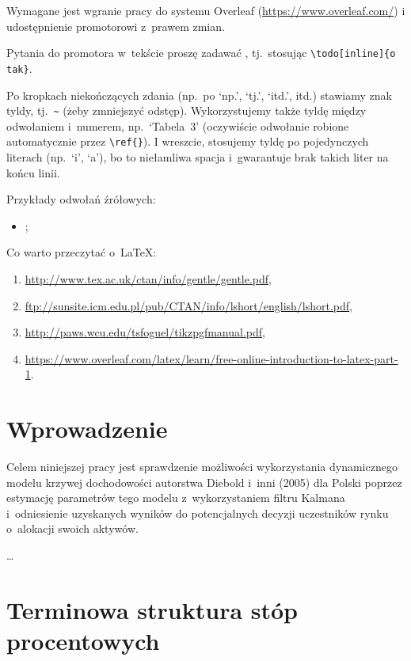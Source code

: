 \documentclass[12pt,a4paper,twoside,openany]{book}
\begin{document}
Wymagane jest wgranie pracy do systemu Overleaf (\url{https://www.overleaf.com/}) i udostępnienie promotorowi z~prawem zmian.

Pytania do promotora w~tekście proszę zadawać , tj.~stosując \verb!\todo[inline]{o tak}!.

Po kropkach niekończących zdania (np.~po `np.', `tj.', `itd.', itd.) stawiamy znak tyldy, tj.~\verb!~! (żeby zmniejszyć odstęp). Wykorzystujemy także tyldę między odwołaniem i~numerem, np.~`Tabela~3' (oczywiście odwołanie robione automatycznie przez \verb!\ref{}!). I wreszcie, stosujemy tyldę po pojedynczych literach (np.~`i', `a'), bo to niełamliwa spacja i~gwarantuje brak takich liter na końcu linii.

Przykłady odwołań źrółowych:
\begin{itemize}

\item {};

\end{itemize}

Co warto przeczytać o~\LaTeX:
\begin{enumerate}
\footnotesize %
\item \url{http://www.tex.ac.uk/ctan/info/gentle/gentle.pdf},
\item \url{ftp://sunsite.icm.edu.pl/pub/CTAN/info/lshort/english/lshort.pdf},
\item \url{http://paws.wcu.edu/tsfoguel/tikzpgfmanual.pdf},
\item \url{https://www.overleaf.com/latex/learn/free-online-introduction-to-latex-part-1}.
\end{enumerate}

\chapter{Wprowadzenie}

Celem niniejszej pracy jest sprawdzenie możliwości wykorzystania dynamicznego modelu krzywej dochodowości autorstwa Diebold i~inni (2005) dla Polski poprzez estymację parametrów tego modelu z~wykorzystaniem filtru Kalmana i~odniesienie uzyskanych wyników do potencjalnych decyzji uczestników rynku o~alokacji swoich aktywów.

\ldots

\chapter{Terminowa struktura stóp procentowych}
\label{sec:termin}
\end{document}
